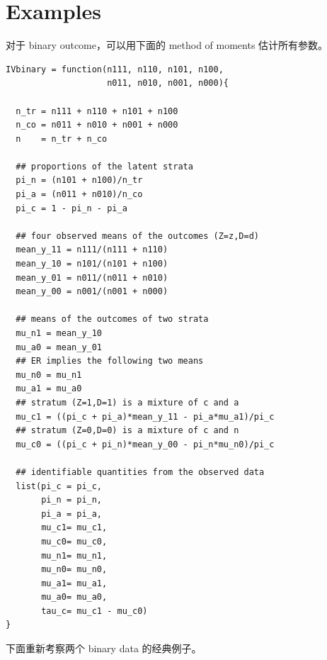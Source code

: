 \section{Examples}\label{section::binary-y-ivineq}


对于 binary outcome，可以用下面的 method of moments 估计所有参数。


\begin{lstlisting}
IVbinary = function(n111, n110, n101, n100, 
                    n011, n010, n001, n000){
  
  n_tr = n111 + n110 + n101 + n100
  n_co = n011 + n010 + n001 + n000
  n    = n_tr + n_co
  
  ## proportions of the latent strata
  pi_n = (n101 + n100)/n_tr
  pi_a = (n011 + n010)/n_co
  pi_c = 1 - pi_n - pi_a
  
  ## four observed means of the outcomes (Z=z,D=d)
  mean_y_11 = n111/(n111 + n110)
  mean_y_10 = n101/(n101 + n100)
  mean_y_01 = n011/(n011 + n010)
  mean_y_00 = n001/(n001 + n000)
  
  ## means of the outcomes of two strata
  mu_n1 = mean_y_10
  mu_a0 = mean_y_01
  ## ER implies the following two means
  mu_n0 = mu_n1
  mu_a1 = mu_a0
  ## stratum (Z=1,D=1) is a mixture of c and a
  mu_c1 = ((pi_c + pi_a)*mean_y_11 - pi_a*mu_a1)/pi_c
  ## stratum (Z=0,D=0) is a mixture of c and n
  mu_c0 = ((pi_c + pi_n)*mean_y_00 - pi_n*mu_n0)/pi_c
  
  ## identifiable quantities from the observed data
  list(pi_c = pi_c, 
       pi_n = pi_n, 
       pi_a = pi_a, 
       mu_c1= mu_c1,
       mu_c0= mu_c0,
       mu_n1= mu_n1,
       mu_n0= mu_n0,
       mu_a1= mu_a1,
       mu_a0= mu_a0,
       tau_c= mu_c1 - mu_c0)
}
\end{lstlisting}


下面重新考察两个 binary data 的经典例子。

